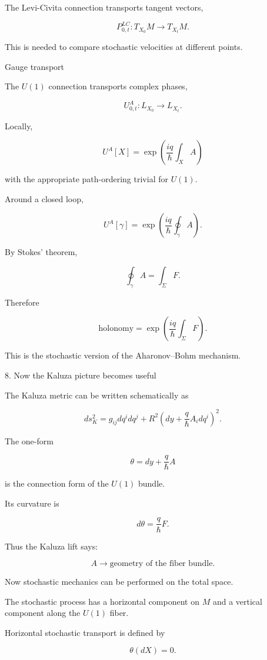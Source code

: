The Levi-Civita connection transports tangent vectors,

$$ P^{LC}_{0,t}:T_{X_0}M\rightarrow T_{X_t}M. $$

This is needed to compare stochastic velocities at different points.

Gauge transport

The \(U(1)\) connection transports complex phases,

$$ U^A_{0,t}:L_{X_0}\rightarrow L_{X_t}. $$

Locally,

$$ \boxed{ U^A[X] = \exp\left( \frac{iq}{\hbar} \int_X A \right) } $$

with the appropriate path-ordering trivial for \(U(1)\).

Around a closed loop,

$$ U^A[\gamma] = \exp\left( \frac{iq}{\hbar} \oint_\gamma A \right). $$

By Stokes' theorem,

$$ \oint_\gamma A = \int_\Sigma F. $$

Therefore

$$ \boxed{ \text{holonomy} = \exp\left( \frac{iq}{\hbar} \int_\Sigma F \right). } $$

This is the stochastic version of the Aharonov--Bohm mechanism.

8. Now the Kaluza picture becomes useful

The Kaluza metric can be written schematically as

$$ ds^2_{K} = g_{ij}dq^i dq^j + R^2 \left( dy+\frac{q}{\hbar}A_i dq^i \right)^2. $$

The one-form

$$ \boxed{ \theta=dy+\frac{q}{\hbar}A } $$

is the connection form of the \(U(1)\) bundle.

Its curvature is

$$ d\theta = \frac{q}{\hbar}F. $$

Thus the Kaluza lift says:

$$ \boxed{ A\rightarrow\text{geometry of the fiber bundle}. } $$

Now stochastic mechanics can be performed on the total space.

The stochastic process has a horizontal component on \(M\) and a vertical component along the \(U(1)\) fiber.

Horizontal stochastic transport is defined by

$$ \theta(dX)=0. $$

